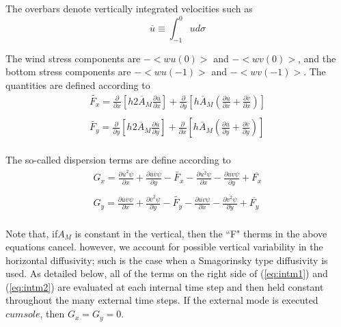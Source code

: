 \documentclass[oribibl]{llncs}
\begin{document}
The overbars denote vertically integrated velocities such as
\begin{equation}
\overline{u} \equiv \int_{-1}^{0} u d \sigma
\end{equation}

The wind stress components are $-<wu(0)>$  and $-<wv(0)> $, and the bottom stress components are $-<wu(-1)>$  and $-<wv(-1)> $. The quantities are defined according to
\begin{eqnarray}
\tilde{F_x}=\frac{\partial}{\partial x} \left[ h2 \overline{A}_M \frac{\partial \overline{u}}{\partial x} \right] +\frac{\partial}{\partial y} \left[ h \overline{A}_M \left( \frac{\partial \overline{u}}{\partial x} + \frac{\partial \overline{v}}{\partial x}\right) \right] \\
\nonumber\\
\tilde{F_y}=\frac{\partial}{\partial y} \left[ h2 \overline{A}_M \frac{\partial \overline{u}}{\partial y} \right] +\frac{\partial}{\partial x} \left[ h \overline{A}_M \left( \frac{\partial \overline{u}}{\partial y} + \frac{\partial \overline{v}}{\partial y}\right) \right] \\
\end{eqnarray}

The so-called dispersion terms are define according to
\begin{eqnarray}
G_x=\frac{\partial \overline{u}^2 \psi}{\partial x} +\frac{\partial \overline{u} \overline{v} \psi}{\partial y} -  \tilde{F_x} - \frac{\partial \overline{u^2} \psi}{\partial x} -\frac{\partial \overline{uv} \psi}{\partial y} + \overline{F_x}\\
\nonumber\\
G_y=\frac{\partial \overline{u}\overline{v} \psi}{\partial x} +\frac{\partial \overline{v} ^2 \psi}{\partial y} -  \tilde{F_y} - \frac{\partial \overline{uv} \psi}{\partial x} -\frac{\partial \overline{v^2} \psi}{\partial y} + \overline{F_y}\\
\end{eqnarray}

Note that, if$ A_M$ is constant in the vertical, then the ``F" therms in the above equations cancel. however, we account for possible vertical variability in the horizontal diffusivity; such is the case when a Smagorinsky type diffusivity is used. As detailed below, all of the terms on the right side of (\ref{eq:intm1}) and (\ref{eq:intm2}) are evaluated at each internal time step and then held constant throughout the many external time steps. If the external mode is executed $cum sole$, then $G_x=G_y=0$.
\end{document}
